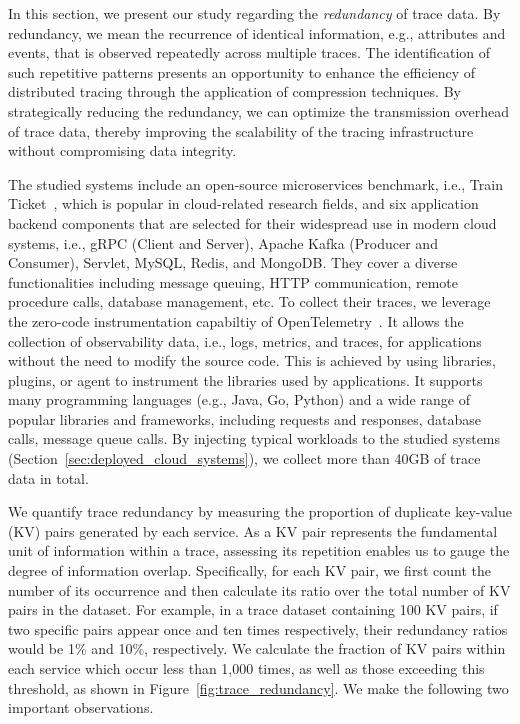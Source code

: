 
In this section, we present our study regarding the \textit{redundancy} of trace data.
By redundancy, we mean the recurrence of identical information, e.g., attributes and events, that is observed repeatedly across multiple traces.
The identification of such repetitive patterns presents an opportunity to enhance the efficiency of distributed tracing through the application of compression techniques.
By strategically reducing the redundancy, we can optimize the transmission overhead of trace data, thereby improving the scalability of the tracing infrastructure without compromising data integrity.

The studied systems include an open-source microservices benchmark, i.e., Train Ticket~\cite{DBLP:journals/tse/ZhouPXSJLD21}, which is popular in cloud-related research fields, and six application backend components that are selected for their widespread use in modern cloud systems, i.e., gRPC (Client and Server), Apache Kafka (Producer and Consumer), Servlet, MySQL, Redis, and MongoDB.
They cover a diverse functionalities including message queuing, HTTP communication, remote procedure calls, database management, etc.
To collect their traces, we leverage the zero-code instrumentation capabiltiy of OpenTelemetry~\cite{opentelemetry_zero_code}.
It allows the collection of observability data, i.e., logs, metrics, and traces, for applications without the need to modify the source code.
This is achieved by using libraries, plugins, or agent to instrument the libraries used by applications.
It supports many programming languages (e.g., Java, Go, Python) and a wide range of popular libraries and frameworks, including requests and responses, database calls, message queue calls.
By injecting typical workloads to the studied systems (Section~\ref{sec:deployed_cloud_systems}), we collect more than 40GB of trace data in total.

We quantify trace redundancy by measuring the proportion of duplicate key-value (KV) pairs generated by each service.
As a KV pair represents the fundamental unit of information within a trace, assessing its repetition enables us to gauge the degree of information overlap.
Specifically, for each KV pair, we first count the number of its occurrence and then calculate its ratio over the total number of KV pairs in the dataset.
For example, in a trace dataset containing 100 KV pairs, if two specific pairs appear once and ten times respectively, their redundancy ratios would be 1\% and 10\%, respectively.
We calculate the fraction of KV pairs within each service which occur less than 1,000 times, as well as those exceeding this threshold, as shown in Figure~\ref{fig:trace_redundancy}.
We make the following two important observations.

